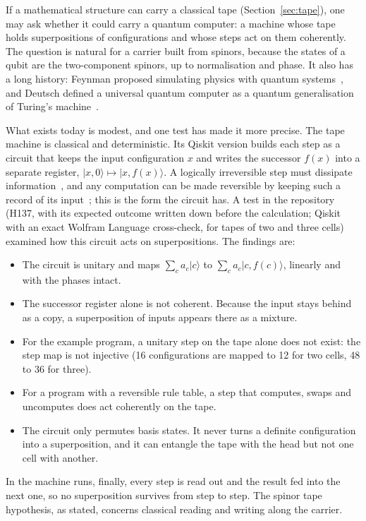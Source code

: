 If a mathematical structure can carry a classical tape (Section~\ref{sec:tape}), one may ask whether it could carry a quantum computer:
a machine whose tape holds superpositions of configurations and whose steps act on them coherently. The question is natural for a
carrier built from spinors, because the states of a qubit are the two-component spinors, up to normalisation and phase. It also has a long history: Feynman
proposed simulating physics with quantum systems~\cite{feynman82}, and Deutsch defined a universal quantum computer as a quantum generalisation of Turing's machine~\cite{deutsch85}.

What exists today is modest, and one test has made it more precise. The tape machine is classical and deterministic. Its Qiskit version
builds each step as a circuit that keeps the input configuration $x$ and writes the successor $f(x)$ into a separate register,
$|x,0\rangle\mapsto|x,f(x)\rangle$. A logically irreversible step must dissipate information~\cite{landauer61}, and any computation can be
made reversible by keeping such a record of its input~\cite{bennett73}; this is the form the circuit has. A test in the
repository~\cite{repo} (H137, with its expected outcome written down before the calculation; Qiskit with an exact Wolfram Language
cross-check, for tapes of two and three cells) examined how this circuit acts on superpositions. The findings are:
\begin{itemize}[nosep,leftmargin=1.5em]
\item The circuit is unitary and maps $\sum_c a_c|c\rangle$ to $\sum_c a_c|c,f(c)\rangle$, linearly and with the phases intact.
\item The successor register alone is not coherent. Because the input stays behind as a copy, a superposition of inputs appears there as a
mixture.
\item For the example program, a unitary step on the tape alone does not exist: the step map is not injective (16 configurations are
mapped to 12 for two cells, 48 to 36 for three).
\item For a program with a reversible rule table, a step that computes, swaps and uncomputes does act coherently on the tape.
\item The circuit only permutes basis states. It never turns a definite configuration into a superposition, and it can entangle the tape
with the head but not one cell with another.
\end{itemize}
In the machine runs, finally, every step is read out and the result fed into the next one, so no superposition survives from step to
step. The spinor tape hypothesis, as stated, concerns classical reading and writing along the carrier.

